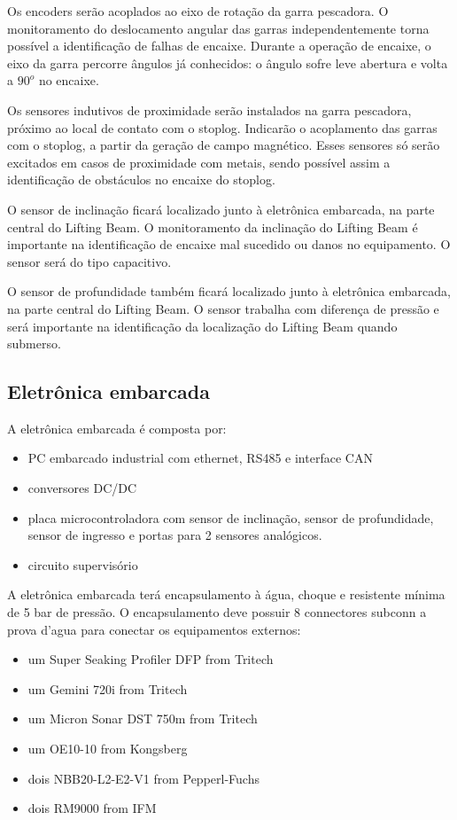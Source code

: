 Os encoders serão acoplados ao eixo de rotação da garra pescadora. O
monitoramento do deslocamento angular das garras independentemente torna
possível a identificação de falhas de encaixe. Durante a operação de encaixe, o
eixo da garra percorre ângulos já conhecidos: o ângulo sofre leve abertura e
volta a $90^o$ no encaixe. 

Os sensores indutivos de proximidade serão instalados na garra pescadora,
próximo ao local de contato com o stoplog. Indicarão o acoplamento das garras
com o stoplog, a partir da geração de campo magnético. Esses sensores só serão
excitados em casos de proximidade com metais, sendo possível assim a
identificação de obstáculos no encaixe do stoplog. 

O sensor de inclinação ficará localizado junto à eletrônica embarcada, na parte
central do Lifting Beam. O monitoramento da inclinação do Lifting Beam é
importante na identificação de encaixe mal sucedido ou danos no equipamento. O
sensor será do tipo capacitivo.

O sensor de profundidade também ficará localizado junto à eletrônica embarcada,
na parte central do Lifting Beam. O sensor trabalha com diferença de pressão e
será importante na identificação da localização do Lifting Beam quando submerso.

\subsection{Eletrônica embarcada}
A eletrônica embarcada é composta por: 

\begin{itemize}
	\item PC embarcado industrial com ethernet, RS485 e interface CAN
	\item  conversores DC/DC
	\item  placa microcontroladora com sensor de inclinação, sensor de profundidade, sensor de ingresso 	 	e portas para 2 sensores analógicos. 
	\item circuito supervisório
\end{itemize}

A eletrônica embarcada terá encapsulamento à  água,
choque e resistente mínima de 5 bar de pressão. O encapsulamento deve possuir 8 connectores subconn a prova d'agua para conectar os equipamentos externos: 

\begin{itemize}
 	\item um Super Seaking Profiler DFP from Tritech
 	\item um Gemini 720i from Tritech
	\item um Micron Sonar DST 750m from Tritech
	\item um OE10-10 from Kongsberg
	\item dois NBB20-L2-E2-V1 from Pepperl-Fuchs
	\item dois RM9000 from IFM 
\end{itemize}




